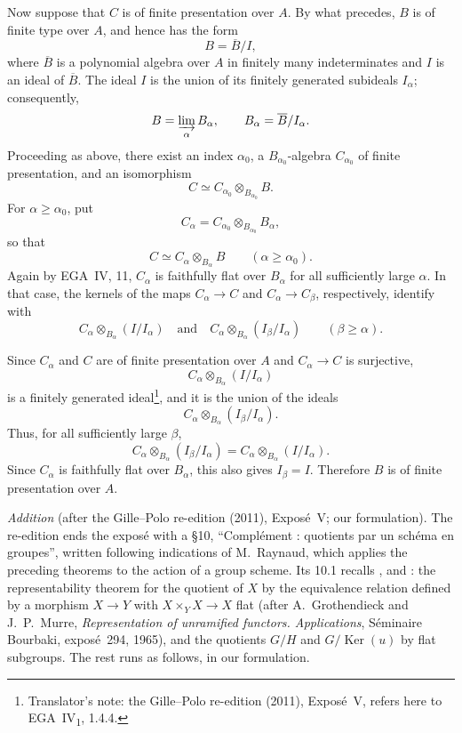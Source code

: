 Now suppose that \(C\) is of finite presentation over \(A\). By what
precedes, \(B\) is of finite type over \(A\), and hence has the form
\[
  B=\overline B/I,
\]
where \(\overline B\) is a polynomial algebra over \(A\) in finitely
many indeterminates and \(I\) is an ideal of \(\overline B\). The
ideal \(I\) is the union of its finitely generated subideals
\(I_\alpha\); consequently,
\[
  B=\varinjlim_\alpha B_\alpha,
  \qquad B_\alpha=\overline B/I_\alpha.
\]
Proceeding as above, there exist an index \(\alpha_0\), a
\(B_{\alpha_0}\)-algebra \(C_{\alpha_0}\) of finite presentation,
and an isomorphism
\[
  C\simeq C_{\alpha_0}\otimes_{B_{\alpha_0}}B.
\]
For \(\alpha\geq\alpha_0\), put
\[
  C_\alpha=C_{\alpha_0}\otimes_{B_{\alpha_0}}B_\alpha,
\]
so that
\[
  C\simeq C_\alpha\otimes_{B_\alpha}B
  \qquad(\alpha\geq\alpha_0).
\]
Again by EGA~IV, 11,
\(C_\alpha\) is faithfully flat over \(B_\alpha\) for all sufficiently
large \(\alpha\). In that case, the kernels of the maps
\(C_\alpha\to C\) and \(C_\alpha\to C_\beta\), respectively, identify
with
\[
  C_\alpha\otimes_{B_\alpha}(I/I_\alpha)
  \quad\text{and}\quad
  C_\alpha\otimes_{B_\alpha}(I_\beta/I_\alpha)
  \qquad(\beta\geq\alpha).
\]

Since \(C_\alpha\) and \(C\) are of finite presentation over \(A\)
and \(C_\alpha\to C\) is surjective,
\[
  C_\alpha\otimes_{B_\alpha}(I/I_\alpha)
\]
is a finitely generated ideal\footnote{Translator's note: the Gille--Polo re-edition (2011), Exposé~V, refers
here to EGA~IV\textsubscript{1}, 1.4.4.}, and it is the union of the
ideals
\[
  C_\alpha\otimes_{B_\alpha}(I_\beta/I_\alpha).
\]
Thus, for all sufficiently large \(\beta\),
\[
  C_\alpha\otimes_{B_\alpha}(I_\beta/I_\alpha)
  =
  C_\alpha\otimes_{B_\alpha}(I/I_\alpha).
\]
Since \(C_\alpha\) is faithfully flat over \(B_\alpha\), this also
gives \(I_\beta=I\). Therefore \(B\) is of finite presentation over
\(A\).

\par\medskip\noindent
\emph{Addition} (after the Gille--Polo re-edition (2011), Exposé~V; our
formulation). The re-edition ends the exposé with a \S10, ``Complément :
quotients par un schéma en groupes'', written following indications of
M.~Raynaud, which applies the preceding theorems to the action of a group
scheme. Its 10.1 recalls ,  and : the
representability theorem for the quotient of \(X\) by the equivalence
relation defined by a morphism \(X\to Y\) with \(X\times_YX\to X\) flat (after
A.~Grothendieck and J.~P.~Murre, \emph{Representation of unramified
functors. Applications}, Séminaire Bourbaki, exposé~294, 1965), and the
quotients \(G/H\) and \(G/\operatorname{Ker}(u)\) by flat subgroups. The rest runs
as follows, in our formulation.

